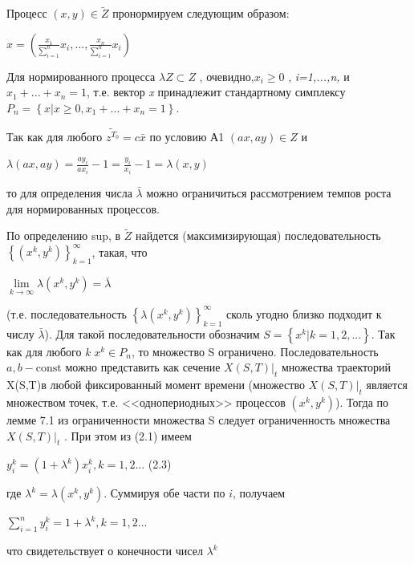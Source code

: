 \documentclass[12pt, 4paper]{book}
\begin{document}
{Процесс $(x,y) \in \tilde{Z}$ пронормируем следующим образом:
\begin{center}
$x = (\frac{x_1}{\sum\limits_{i=1}^{n}}x_i , ..., \frac{x_n}{\sum\limits_{i=1}^{n}}x_i)$
\end{center}
\par

Для нормированного процесса $\lambda Z \subset Z$ , очевидно,$x_i \geq 0$ , \textit{i=1,...,n,} и $x_1 + ... + x_n = 1$, т.е. вектор \textit{x} принадлежит стандартному симплексу $P_n=\left\{x|x \geq 0, x_1+... + x_n = 1\right\}$.
\par

Так как для любого $\tilde{z^{T_0}}=c\bar{x}$ по условию А1 $(ax,ay)\in Z$ и 
\begin{center}
$\lambda(ax,ay)=\frac{a y_i}{a x_i} - 1= \frac{y_i}{x_i} -1 = \lambda(x,y)$
\end{center}
то для определения числа $\bar{\lambda}$ можно ограничиться рассмотрением темпов роста для нормированных процессов.
\par

По определению sup, в $\tilde{Z}$ найдется (максимизирующая) последовательность $\left\{(x^k,y^k)\right\}_{k=1}^{\infty}$, такая, что 
\begin{center}
$ \lim\limits_{k \rightarrow \infty}\lambda (x^k,y^k)=\bar{\lambda}$
\end{center}
(т.е. последовательность $\left\{\lambda(x^k,y^k)\right\}_{k=1}^{\infty}$ сколь угодно близко подходит к числу $\bar{\lambda}$). Для такой последовательности обозначим $S=\left\{x^k|k=1,2,...\right\}$. Так как для любого \textit{k} $x^k \in P_n$, то множество S ограничено. Последовательность $a,b - \text{const}$ можно представить как сечение $X(S,T)|_{t}$ множества траекторий X(S,T)в любой фиксированный момент времени (множество $X(S,T)|_{t}$ является множеством точек, т.е. <<однопериодных>> процессов $(x^k,y^k)$). Тогда по лемме 7.1 из ограниченности множества S следует ограниченность множества $X(S,T)|_{t}$ . При этом из (2.1) имеем
\begin{center}
$y_{i}^k = (1+\lambda^k)x_{i}^{k} ,k=1,2 ...$ (2.3)
\end{center}
где $\lambda^k = \lambda (x^k,y^k)$. Суммируя обе части по $i$, получаем
\begin{center}
$\sum\limits_{i=1}^{n}y_{i}^{k}=1+ \lambda^k, k=1,2...$
\end{center}
что свидетельствует о конечности чисел $\lambda^k$ 
\par

}
\end{document}
